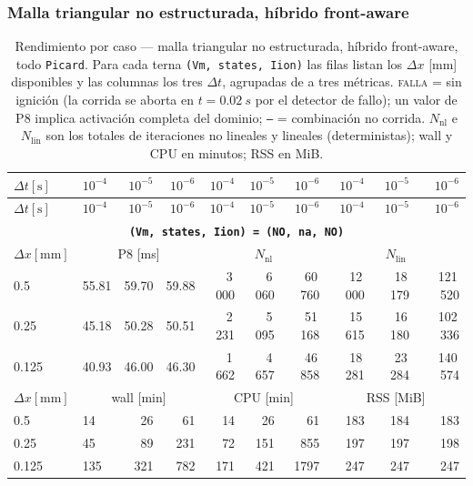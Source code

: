 \documentclass[11pt,a4paper]{article}
\newcommand{\code}[1]{\texttt{\small #1}}
\begin{document}
\subsubsection{Malla triangular no estructurada, híbrido front-aware}
\label{sec:res2d:triT}
\begin{center}\footnotesize
\begin{longtable}{l|lrr|rrr|rrr}
\caption{Rendimiento por caso --- malla triangular no estructurada, h\'ibrido front-aware, todo \code{Picard}. Para cada terna \code{(Vm, states, Iion)} las filas listan los $\Delta x$ [mm] disponibles y las columnas los tres $\Delta t$, agrupadas de a tres m\'etricas. \textsc{falla} = sin ignici\'on (la corrida se aborta en $t=\SI{0.02}{s}$ por el detector de fallo); un valor de P8 implica activaci\'on completa del dominio; \texttt{--} = combinaci\'on no corrida. $N_{\mathrm{nl}}$ e $N_{\mathrm{lin}}$ son los totales de iteraciones no lineales y lineales (deterministas); wall y CPU en minutos; RSS en MiB.}\label{tab:res2d:triT}\\
\toprule $ \Delta t [\text{s}]$ & $10^{-4}$ & $10^{-5}$ & $10^{-6}$ & $10^{-4}$ & $10^{-5}$ & $10^{-6}$ & $10^{-4}$ & $10^{-5}$ & $10^{-6}$\\ \midrule\endfirsthead
\toprule $ \Delta t [\text{s}]$ & $10^{-4}$ & $10^{-5}$ & $10^{-6}$ & $10^{-4}$ & $10^{-5}$ & $10^{-6}$ & $10^{-4}$ & $10^{-5}$ & $10^{-6}$\\ \midrule\endhead
\multicolumn{10}{c}{\textbf{\code{(Vm, states, Iion) = (NO, na, NO)}}}\\\hline
$ \Delta x [\text{mm}] $ & \multicolumn{3}{c|}{P8 [ms]} & \multicolumn{3}{c|}{$N_{\mathrm{nl}}$} & \multicolumn{3}{c|}{$N_{\mathrm{lin}}$}\\
0.5 & 55.81 & 59.70 & 59.88 & 3\,000 & 6\,060 & 60\,760 & 12\,000 & 18\,179 & 121\,520\\
0.25 & 45.18 & 50.28 & 50.51 & 2\,231 & 5\,095 & 51\,168 & 15\,615 & 16\,180 & 102\,336\\
0.125 & 40.93 & 46.00 & 46.30 & 1\,662 & 4\,657 & 46\,858 & 18\,281 & 23\,284 & 140\,574\\
\hline
$ \Delta x [\text{mm}] $ & \multicolumn{3}{c|}{wall [min]} & \multicolumn{3}{c|}{CPU [min]} & \multicolumn{3}{c|}{RSS [MiB]}\\
0.5 & 14 & 26 & 61 & 14 & 26 & 61 & 183 & 184 & 183\\
0.25 & 45 & 89 & 231 & 72 & 151 & 855 & 197 & 197 & 198\\
0.125 & 135 & 321 & 782 & 171 & 421 & 1797 & 247 & 247 & 247\\

\end{longtable}
\end{center}
\end{document}
